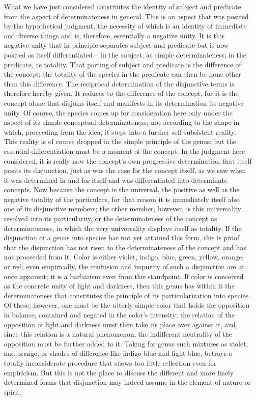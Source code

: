 What we have just considered constitutes
the identity of subject and predicate
from the aspect of determinateness in general.
This is an aspect that was posited by the hypothetical judgment,
the necessity of which is an identity of immediate and diverse things
and is, therefore, essentially a negative unity.
It is this negative unity that in principle
separates subject and predicate
but is now posited as itself differentiated –
in the subject, as simple determinateness;
in the predicate, as totality.
That parting of subject and predicate is
the difference of the concept;
the totality of the species in the predicate can
then be none other than this difference.
The reciprocal determination of the disjunctive terms is
therefore hereby given.
It reduces to the difference of the concept,
for it is the concept alone that disjoins itself
and manifests in its determination its negative unity.
Of course, the species comes up for consideration here only under the
aspect of its simple conceptual determinateness, not according to the shape
in which, proceeding from the idea,
it steps into a further self-subsistent reality.
This reality is of course dropped in the simple principle of the genus;
but the essential differentiation must be a moment of the concept.
In the judgment here considered, it is really now
the concept's own progressive determination
that itself posits its disjunction,
just as was the case for the concept itself,
as we saw when it was determined in and for itself
and was differentiated into determinate concepts.
Now because the concept is the universal,
the positive as well as the negative totality of the particulars,
for that reason it is immediately itself also
one of its disjunctive members;
the other member, however, is
this universality resolved into its particularity,
or the determinateness of the concept as determinateness,
in which the very universality displays itself as totality.
If the disjunction of a genus into species has
not yet attained this form,
this is proof that the disjunction has not risen
to the determinateness of the concept
and has not proceeded from it.
Color is either violet, indigo, blue, green, yellow, orange, or red;
even empirically, the confusion and impurity of
such a disjunction are at once apparent;
it is a barbarism even from this standpoint.
If color is conceived as the concrete
unity of light and darkness,
then this genus has within it the determinateness
that constitutes the principle of
its particularization into species.
Of these, however, one must be the utterly simple color
that holds the opposition in balance,
contained and negated in the color's intensity;
the relation of the opposition of light and darkness
must then take its place over against it,
and, since this relation is a natural phenomenon,
the indifferent neutrality of the opposition must be further added to it.
Taking for genus such mixtures as violet, and orange,
or shades of difference like indigo blue and light blue,
betrays a totally inconsiderate procedure
that shows too little reflection even for empiricism.
But this is not the place to discuss the different
and more finely determined forms that disjunction
may indeed assume in the element of nature or spirit.

